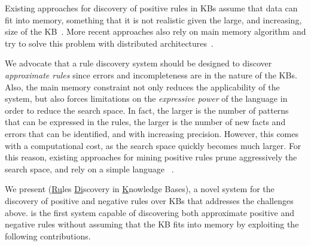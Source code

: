 Existing approaches for discovery of positive rules in KBs assume that data can fit into memory, something that it is not realistic given the large, and increasing, size of the KB~\cite{abedjan2014amending,galarraga2015fast}. More recent approaches also rely on main memory algorithm and try to solve this problem with distributed architectures~\cite{Chen:2016,DBLP:conf/sigmod/FaridRIHC16}.




We advocate that a rule discovery system should be designed to discover {\em approximate rules} since errors and incompleteness are in the nature of the KBs. Also, the main memory constraint not only reduces the applicability of the system, but also forces limitations on the {\em expressive power} of the language in order to reduce the search space.
In fact, the larger is the number of patterns that can be expressed in the rules, %
the larger is the number of new facts and errors that can be identified, and with increasing precision. However, this comes with a computational cost, as the search space quickly becomes much larger. For this reason, existing approaches for mining positive rules prune aggressively the search space, and rely on a simple language%
~\cite{Chen:2016,abedjan2014amending,galarraga2015fast}.

\vspace{1ex}
We present \krd (\underline{Ru}les \underline{Di}scovery in \underline{K}nowledge Bases), a novel system for the discovery of positive and negative rules %
over KBs that addresses the challenges above.  
\krd is the first system capable of discovering both approximate positive and negative rules without
assuming that the KB fits into memory by exploiting the following contributions.

